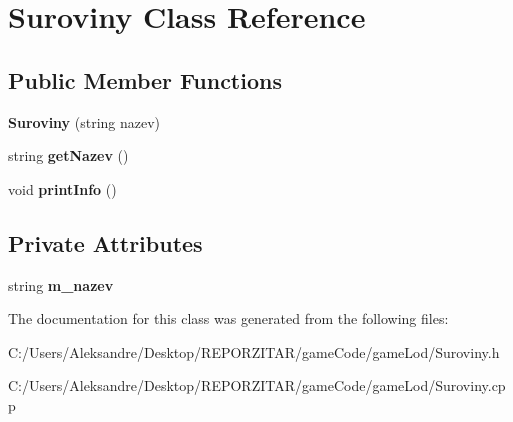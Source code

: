 \hypertarget{class_suroviny}{}\section{Suroviny Class Reference}
\label{class_suroviny}
\subsection*{Public Member Functions}
\begin{DoxyCompactItemize}
\item 
\mbox{\label{class_suroviny_a18dcebcaa5e0b5461e60a614d036e5ae}} 
{\bfseries Suroviny} (string nazev)
\item 
\mbox{\label{class_suroviny_a25629023132f811fb43db7112fe9a436}} 
string {\bfseries get\+Nazev} ()
\item 
\mbox{\label{class_suroviny_a66975334376d77a96ee1f5d83a35f6d5}} 
void {\bfseries print\+Info} ()
\end{DoxyCompactItemize}
\subsection*{Private Attributes}
\begin{DoxyCompactItemize}
\item 
\mbox{\label{class_suroviny_a12dfb3d019df9d1a4a278cad0d2b6bc1}} 
string {\bfseries m\+\_\+nazev}
\end{DoxyCompactItemize}


The documentation for this class was generated from the following files\+:\begin{DoxyCompactItemize}
\item 
C\+:/\+Users/\+Aleksandre/\+Desktop/\+R\+E\+P\+O\+R\+Z\+I\+T\+A\+R/game\+Code/game\+Lod/Suroviny.\+h\item 
C\+:/\+Users/\+Aleksandre/\+Desktop/\+R\+E\+P\+O\+R\+Z\+I\+T\+A\+R/game\+Code/game\+Lod/Suroviny.\+cpp\end{DoxyCompactItemize}
